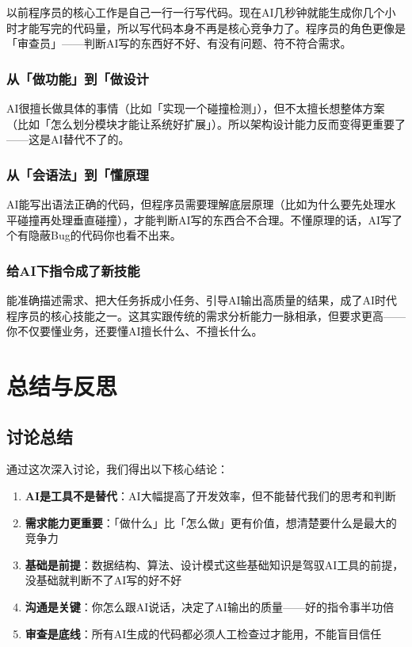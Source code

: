 \documentclass[12pt,a4paper]{article}
\begin{document}
以前程序员的核心工作是自己一行一行写代码。现在AI几秒钟就能生成你几个小时才能写完的代码量，所以写代码本身不再是核心竞争力了。程序员的角色更像是「审查员」——判断AI写的东西好不好、有没有问题、符不符合需求。

\subsubsection{从「做功能」到「做设计}

AI很擅长做具体的事情（比如「实现一个碰撞检测」），但不太擅长想整体方案（比如「怎么划分模块才能让系统好扩展」）。所以架构设计能力反而变得更重要了——这是AI替代不了的。

\subsubsection{从「会语法」到「懂原理}

AI能写出语法正确的代码，但程序员需要理解底层原理（比如为什么要先处理水平碰撞再处理垂直碰撞），才能判断AI写的东西合不合理。不懂原理的话，AI写了个有隐蔽Bug的代码你也看不出来。

\subsubsection{给AI下指令成了新技能}

能准确描述需求、把大任务拆成小任务、引导AI输出高质量的结果，成了AI时代程序员的核心技能之一。这其实跟传统的需求分析能力一脉相承，但要求更高——你不仅要懂业务，还要懂AI擅长什么、不擅长什么。


\section{总结与反思}

\subsection{讨论总结}

通过这次深入讨论，我们得出以下核心结论：

\begin{enumerate}[leftmargin=2em]
    \item \textbf{AI是工具不是替代}：AI大幅提高了开发效率，但不能替代我们的思考和判断
    \item \textbf{需求能力更重要}：「做什么」比「怎么做」更有价值，想清楚要什么是最大的竞争力
    \item \textbf{基础是前提}：数据结构、算法、设计模式这些基础知识是驾驭AI工具的前提，没基础就判断不了AI写的好不好
    \item \textbf{沟通是关键}：你怎么跟AI说话，决定了AI输出的质量——好的指令事半功倍
    \item \textbf{审查是底线}：所有AI生成的代码都必须人工检查过才能用，不能盲目信任
\end{enumerate}
\end{document}
